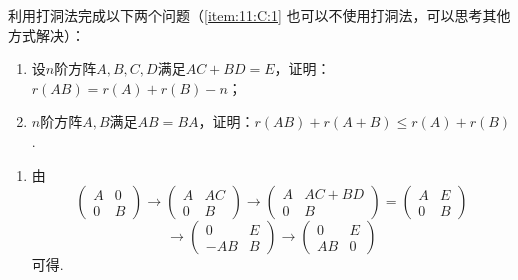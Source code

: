 \begin{exercise}
\begin{exgroup}
        \item 利用打洞法完成以下两个问题（\ref*{item:11:C:1} 也可以不使用打洞法，可以思考其他方式解决）：
        \begin{enumerate}
            \item 设$n$阶方阵$A,B,C,D$满足$AC+BD=E$，证明：$r(AB) = r(A)+r(B)-n$；

            \item \label{item:11:C:1}
                  $n$阶方阵$A,B$满足$AB=BA$，证明：$r(AB)+r(A+B)\leqslant r(A)+r(B)$.
        \end{enumerate}
        \begin{answer}
            \begin{enumerate}
                \item 由 \[\begin{pmatrix}A & 0 \\ 0 & B\end{pmatrix}\rightarrow \begin{pmatrix}A & AC \\ 0 & B\end{pmatrix}\rightarrow \begin{pmatrix}A & AC+BD \\ 0 & B\end{pmatrix}=\begin{pmatrix}A & E \\ 0 & B\end{pmatrix}\]
                      \[\rightarrow \begin{pmatrix}0 & E \\ -AB & B\end{pmatrix}\rightarrow \begin{pmatrix}0 & E \\ AB & 0\end{pmatrix}\]
                      可得.


\end{enumerate}
\end{answer}
\end{exgroup}
\end{exercise}
